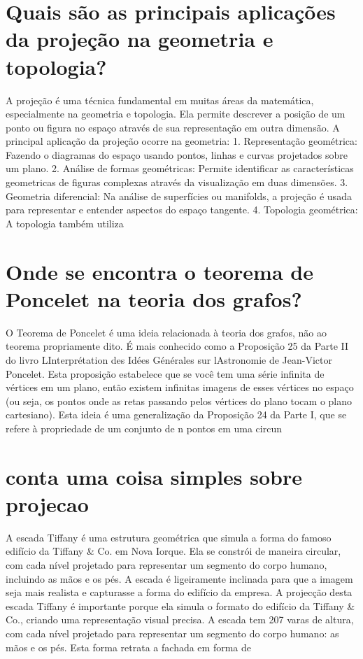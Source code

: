 \documentclass[11pt,a4paper]{article}
\begin{document}
\section{Quais são as principais aplicações da projeção na geometria e topologia?}
A projeção é uma técnica fundamental em muitas áreas da matemática, especialmente na geometria e topologia. Ela permite descrever a posição de um ponto ou figura no espaço através de sua representação em outra dimensão. A principal aplicação da projeção ocorre na geometria: 1. Representação geométrica: Fazendo o diagramas do espaço usando pontos, linhas e curvas projetados sobre um plano. 2. Análise de formas geométricas: Permite identificar as características geometricas de figuras complexas através da visualização em duas dimensões. 3. Geometria diferencial: Na análise de superfícies ou manifolds, a projeção é usada para representar e entender aspectos do espaço tangente. 4. Topologia geométrica: A topologia também utiliza

\section{Onde se encontra o teorema de Poncelet na teoria dos grafos?}
O Teorema de Poncelet é uma ideia relacionada à teoria dos grafos, não ao teorema propriamente dito. É mais conhecido como a Proposição 25 da Parte II do livro LInterprétation des Idées Générales sur lAstronomie de Jean-Victor Poncelet. Esta proposição estabelece que se você tem uma série infinita de vértices em um plano, então existem infinitas imagens de esses vértices no espaço (ou seja, os pontos onde as retas passando pelos vértices do plano tocam o plano cartesiano). Esta ideia é uma generalização da Proposição 24 da Parte I, que se refere à propriedade de um conjunto de n pontos em uma circun

\section{conta uma coisa simples sobre projecao}
A escada Tiffany é uma estrutura geométrica que simula a forma do famoso edifício da Tiffany \& Co. em Nova Iorque. Ela se constrói de maneira circular, com cada nível projetado para representar um segmento do corpo humano, incluindo as mãos e os pés. A escada é ligeiramente inclinada para que a imagem seja mais realista e capturasse a forma do edifício da empresa. A projecção desta escada Tiffany é importante porque ela simula o formato do edifício da Tiffany \& Co., criando uma representação visual precisa. A escada tem 207 varas de altura, com cada nível projetado para representar um segmento do corpo humano: as mãos e os pés. Esta forma retrata a fachada em forma de
\end{document}
